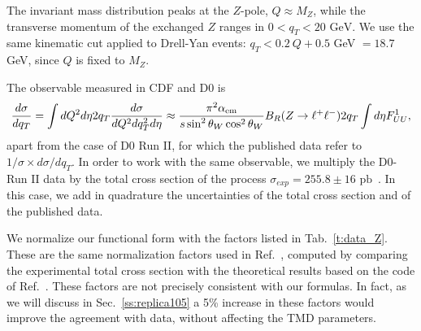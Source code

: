 \documentclass[aps,preprintnumbers,showpacs,nofootinbib,superscriptaddress,floatfix]{revtex4}
\begin{document}
The invariant mass distribution peaks at the $Z$-pole, $Q \approx M_Z$, while the transverse momentum of the exchanged $Z$ ranges in $0< q_T < 20 \text{ GeV}$.
We use the same kinematic cut applied to Drell-Yan events:  $q_T < 0.2\ Q + 0.5$ GeV $ = 18.7$ GeV, since $Q$ is fixed to $M_Z$. 

The observable measured in CDF and D0 is 
\begin{equation} 
\frac{d\sigma}{d q_T} = \int d Q^2 d \eta 2 q_T
\frac{d\sigma}{dQ^2dq^2_T d\eta}
\approx 
\frac{\pi^2 \alpha_{\rm em}}{s \sin^2{\theta_W} \cos^2{\theta_W}}
B_R(Z\rightarrow \ell^+\ell^-) 2 q_T \int d \eta F_{UU}^1,
\end{equation}  
apart from the case
of D0 Run II, for which the published data refer to $1/\sigma \times
d\sigma/dq_T$. In order to work with the same observable, we multiply the
D0-Run II data by the total cross section of the process $\sigma_{exp} = 255.8
\pm 16 \text{ pb}$~\cite{Abulencia:2005ix}. In this case, we add in quadrature
the uncertainties of the total cross section and of the published data. 

We normalize our functional form with the factors listed in
Tab.~\ref{t:data_Z}. These are the same normalization factors used in
Ref.~\cite{DAlesio:2014mrz}, computed by comparing the experimental total
cross section with the theoretical results based on the code of 
Ref.~\cite{Catani:2009sm}. These factors are not precisely consistent with our
formulas. In fact, as we will discuss in Sec.~\ref{ss:replica105} a 5\%
increase in these factors would improve the agreement with data, without
affecting the TMD parameters. 



\renewcommand{\tabcolsep}{0.4pc} %
\renewcommand{\arraystretch}{1.3} %
\end{document}
